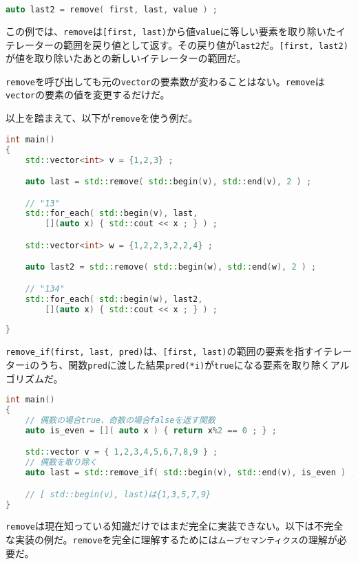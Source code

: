 \ifTombow\pagebreak\fi
\begin{lstlisting}[language={C++}]
auto last2 = remove( first, last, value ) ;
\end{lstlisting}

この例では、\texttt{remove}は\texttt{[first, last)}から値\texttt{value}に等しい要素を取り除いたイテレーターの範囲を戻り値として返す。その戻り値が\texttt{last2}だ。\texttt{[first, last2)}が値を取り除いたあとの新しいイテレーターの範囲だ。

\texttt{remove}を呼び出しても元の\texttt{vector}の要素数が変わることはない。\texttt{remove}は\texttt{vector}の要素の値を変更するだけだ。

以上を踏まえて、以下が\texttt{remove}を使う例だ。

\begin{lstlisting}[language={C++}]
int main()
{
    std::vector<int> v = {1,2,3} ;

    auto last = std::remove( std::begin(v), std::end(v), 2 ) ;

    // "13"
    std::for_each( std::begin(v), last,
        [](auto x) { std::cout << x ; } ) ;

    std::vector<int> w = {1,2,2,3,2,2,4} ;

    auto last2 = std::remove( std::begin(w), std::end(w), 2 ) ;

    // "134"
    std::for_each( std::begin(w), last2,
        [](auto x) { std::cout << x ; } ) ;
   
}
\end{lstlisting}

\texttt{remove\_if(first, last, pred)}は、\texttt{[first, last)}の範囲の要素を指すイテレーター\texttt{i}のうち、関数\texttt{pred}に渡した結果\texttt{pred(*i)}が\texttt{true}になる要素を取り除くアルゴリズムだ。

\begin{lstlisting}[language={C++}]
int main()
{
    // 偶数の場合true、奇数の場合falseを返す関数
    auto is_even = []( auto x ) { return x%2 == 0 ; } ;

    std::vector v = { 1,2,3,4,5,6,7,8,9 } ;
    // 偶数を取り除く
    auto last = std::remove_if( std::begin(v), std::end(v), is_even ) ;

    // [ std::begin(v), last)は{1,3,5,7,9}
}
\end{lstlisting}

\texttt{remove}は現在知っている知識だけではまだ完全に実装できない。以下は不完全な実装の例だ。\texttt{remove}を完全に理解するためには\texttt{ムーブセマンティクス}の理解が必要だ。

